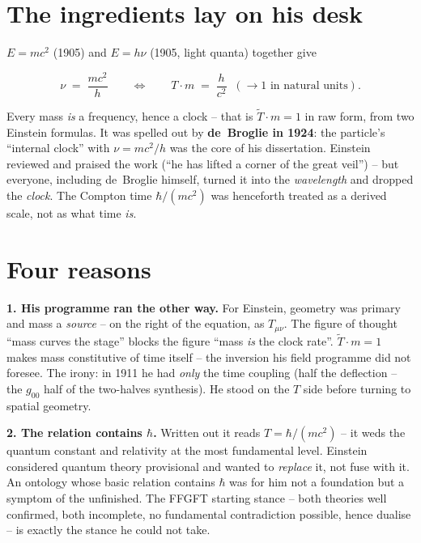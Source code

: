 \documentclass[11pt]{report}
\begin{document}
\section{The ingredients lay on his desk}

$E = mc^2$ (1905) and $E = h\nu$ (1905, light quanta) together
give

\begin{equation}
  \nu \;=\; \frac{mc^2}{h}
  \qquad\Longleftrightarrow\qquad
  T \cdot m \;=\; \frac{h}{c^2} \;\;(\to 1
  \text{ in natural units}).
\end{equation}

Every mass \emph{is} a frequency, hence a clock -- that is
$\tilde T \cdot m = 1$ in raw form, from two Einstein formulas. It
was spelled out by \textbf{de~Broglie in 1924}: the particle's
\enquote{internal clock} with $\nu = mc^2/h$ was the core of his
dissertation. Einstein reviewed and praised the work
(\enquote{he has lifted a corner of the great veil}) -- but
everyone, including de~Broglie himself, turned it into the
\emph{wavelength} and dropped the \emph{clock}. The Compton time
$\hbar/(mc^2)$ was henceforth treated as a derived scale, not as
what time \emph{is}.

\section{Four reasons}

\textbf{1. His programme ran the other way.} For Einstein, geometry
was primary and mass a \emph{source} -- on the right of the
equation, as $T_{\mu\nu}$. The figure of thought \enquote{mass
curves the stage} blocks the figure \enquote{mass \emph{is} the
clock rate}. $\tilde T \cdot m = 1$ makes mass constitutive of time
itself -- the inversion his field programme did not foresee. The
irony: in 1911 he had \emph{only} the time coupling (half the
deflection -- the $g_{00}$ half of the two-halves synthesis). He
stood on the $T$ side before turning to spatial geometry.

\textbf{2. The relation contains $\hbar$.} Written out it reads
$T = \hbar/(mc^2)$ -- it weds the quantum constant and relativity
at the most fundamental level. Einstein considered quantum theory
provisional and wanted to \emph{replace} it, not fuse with it. An
ontology whose basic relation contains $\hbar$ was for him not a
foundation but a symptom of the unfinished. The FFGFT starting
stance -- both theories well confirmed, both incomplete, no
fundamental contradiction possible, hence dualise -- is exactly the
stance he could not take.
\end{document}
